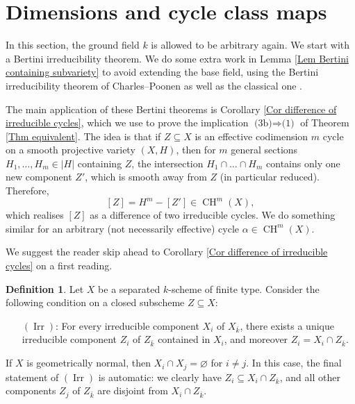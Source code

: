 \documentclass[11pt]{amsart}
\theoremstyle{definition}
\newtheorem{Def}[Thm]{Definition}
\newcommand{\CH}{\operatorname{CH}}
\newcommand{\Irr}{\operatorname{Irr}}
\newcommand{\Ra}{\Rightarrow}
\begin{document}
\section{Dimensions and cycle class maps}\label{Sec Dimensions and cycle class maps}
In this section, the ground field $k$ is allowed to be arbitrary
again. We start with a Bertini irreducibility theorem. We do some
extra work in Lemma \ref{Lem Bertini containing subvariety} to avoid
extending the base field, using the Bertini irreducibility theorem
of Charles--Poonen \cite{ChaPoo} as well as the classical one
\cite[Theorem~6.3(4)]{JouBer}.

The main application of these Bertini theorems is Corollary \ref{Cor
difference of irreducible cycles}, which we use to prove the
implication $\text{(3b)} \Ra \text{(1)}$ of Theorem \ref{Thm
equivalent}. The idea is that if $Z \subseteq X$ is an effective
codimension $m$ cycle on a smooth projective variety $(X,H)$, then
for $m$ general sections $H_1, \ldots, H_m \in |H|$ containing $Z$,
the intersection $H_1 \cap \ldots \cap H_m$ contains only one new
component $Z'$, which is smooth away from $Z$ (in particular
reduced).
%
Therefore,
\[
[Z] = H^m - [Z'] \in \CH^m(X),
\]
which realises $[Z]$ as a difference of two irreducible cycles. We
do something similar for an arbitrary (not necessarily effective)
cycle $\alpha \in \CH^m(X)$.

We suggest the reader skip ahead to Corollary \ref{Cor difference of
irreducible cycles} on a first reading.

\begin{Def}
Let $X$ be a separated $k$-scheme of finite type. Consider the
following condition on a closed subscheme $Z \subseteq X$:
{
\begin{itemize}%
\item[$(\Irr)$:] For every irreducible component $X_i$ of $X_{\bar k}$, there exists a unique irreducible component $Z_i$ of $Z_{\bar k}$ contained in $X_i$, and moreover $Z_i = X_i \cap Z_{\bar k}$.
\end{itemize}}

\smallskip\noindent
If $X$ is geometrically normal, then $X_i \cap X_j = \varnothing$
for $i \neq j$. In this case, the final statement  of $(\Irr)$ is
automatic: we clearly have $Z_i \subseteq X_i \cap Z_{\bar k}$, and
all other components $Z_j$ of $Z_{\bar k}$ are disjoint from $X_i
\cap Z_{\bar k}$.
\end{Def}
\end{document}
